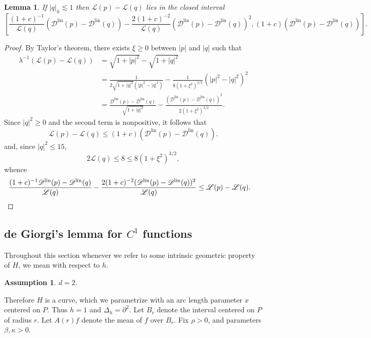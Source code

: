 \documentclass[reqno,12pt,letterpaper]{amsart}
\newcommand{\Lagrange}{\mathscr L}
\newcommand{\DirL}{\mathscr D^{\mathrm{lin}}}
\newtheorem{lemma}[theorem]{Lemma}
\newtheorem{assumption}[theorem]{Assumption}
\theoremstyle{definition}
\numberwithin{equation}{section}
\begin{document}
\begin{lemma}\label{Taylor lemma}
If $|q|_h \lesssim 1$ then $\Lagrange(p) - \Lagrange(q)$ lies in the closed interval
$$\left[\frac{(1 + c)^{-1}}{\Lagrange(q)}(\DirL(p) - \DirL(q)) - \frac{2(1 + c)^{-2}}{\Lagrange(q)}(\DirL(p) - \DirL(q))^2, (1 + c)(\DirL(p) - \DirL(q))\right].$$
\end{lemma}
\begin{proof}
By Taylor's theorem, there exists $\xi \geq 0$ between $|p|$ and $|q|$ such that
\begin{align*}
\lambda^{-1}(\Lagrange(p) - \Lagrange(q)) &= \sqrt{1 + |p|^2} - \sqrt{1 + |q|^2}\\
&= \frac{1}{2 \sqrt{1 + |q|^2}(|p|^2 - |q|^2)} - \frac{1}{8(1 + \xi^2)^{3/2}}(|p|^2 - |q|^2)^2 \\
&= \frac{\DirL(p) - \DirL(q)}{\sqrt{1 + |q|^2}} - \frac{(\DirL(p) - \DirL(q))^2}{2(1 + \xi^2)^{3/2}}.
\end{align*}
Since $|q|^2 \geq 0$ and the second term is nonpositive, it follows that
$$\Lagrange(p) - \Lagrange(q) \leq (1 + c)(\DirL(p) - \DirL(q)).$$
and, since $|q|^2 \leq 15$,
$$2\Lagrange(q) \leq 8 \leq 8(1 + \xi^2)^{3/2},$$
whence
\begin{align*}
\frac{(1 + c)^{-1}\DirL(p) - \DirL(q)}{\Lagrange(q)} - \frac{2(1 + c)^{-2}(\DirL(p) - \DirL(q))^2}{\Lagrange(q)} &\leq \Lagrange(p) - \Lagrange(q).\qedhere
\end{align*}
\end{proof}

\subsection{de Giorgi's lemma for $C^1$ functions}
Throughout this section whenever we refer to some intrinsic geometric property of $H$, we mean with respect to $h$.

\begin{assumption}\label{Assume Dimensions}
$d = 2$.
\end{assumption}

Therefore $H$ is a curve, which we parametrize with an arc length parameter $x$ centered on $P$.
Thus $h = 1$ and $\Delta_h = \partial^2$.
Let $B_r$ denote the interval centered on $P$ of radius $r$.
Let $A(r)f$ denote the mean of $f$ over $B_r$.
Fix $\rho > 0$, and parameters $\beta, \kappa > 0$.
\end{document}
